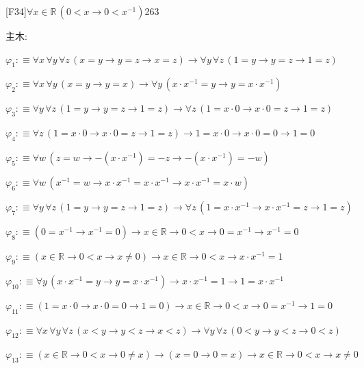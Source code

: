 \begin{fullproof}{[F34]}{$\forall x \in \mathbb{R}\,(0 < x \to 0 < x^{-1})$}{263}
\begin{ptree}
\end{ptree}
\noindent 主木:
\begin{ptree}
\noLine
{}
\noLine
{}
\end{ptree}
\begin{abbrevlist}
\item $\varphi_{1} :\equiv \forall x\,\forall y\,\forall z\,(x = y \to y = z \to x = z) \to \forall y\,\forall z\,(1 = y \to y = z \to 1 = z)$
\item $\varphi_{2} :\equiv \forall x\,\forall y\,(x = y \to y = x) \to \forall y\,(x \cdot x^{-1} = y \to y = x \cdot x^{-1})$
\item $\varphi_{3} :\equiv \forall y\,\forall z\,(1 = y \to y = z \to 1 = z) \to \forall z\,(1 = x \cdot 0 \to x \cdot 0 = z \to 1 = z)$
\item $\varphi_{4} :\equiv \forall z\,(1 = x \cdot 0 \to x \cdot 0 = z \to 1 = z) \to 1 = x \cdot 0 \to x \cdot 0 = 0 \to 1 = 0$
\item $\varphi_{5} :\equiv \forall w\,(z = w \to -(x \cdot x^{-1}) = -z \to -(x \cdot x^{-1}) = -w)$
\item $\varphi_{6} :\equiv \forall w\,(x^{-1} = w \to x \cdot x^{-1} = x \cdot x^{-1} \to x \cdot x^{-1} = x \cdot w)$
\item $\varphi_{7} :\equiv \forall y\,\forall z\,(1 = y \to y = z \to 1 = z) \to \forall z\,(1 = x \cdot x^{-1} \to x \cdot x^{-1} = z \to 1 = z)$
\item $\varphi_{8} :\equiv (0 = x^{-1} \to x^{-1} = 0) \to x \in \mathbb{R} \to 0 < x \to 0 = x^{-1} \to x^{-1} = 0$
\item $\varphi_{9} :\equiv (x \in \mathbb{R} \to 0 < x \to x \neq 0) \to x \in \mathbb{R} \to 0 < x \to x \cdot x^{-1} = 1$
\item $\varphi_{10} :\equiv \forall y\,(x \cdot x^{-1} = y \to y = x \cdot x^{-1}) \to x \cdot x^{-1} = 1 \to 1 = x \cdot x^{-1}$
\item $\varphi_{11} :\equiv (1 = x \cdot 0 \to x \cdot 0 = 0 \to 1 = 0) \to x \in \mathbb{R} \to 0 < x \to 0 = x^{-1} \to 1 = 0$
\item $\varphi_{12} :\equiv \forall x\,\forall y\,\forall z\,(x < y \to y < z \to x < z) \to \forall y\,\forall z\,(0 < y \to y < z \to 0 < z)$
\item $\varphi_{13} :\equiv (x \in \mathbb{R} \to 0 < x \to 0 \neq x) \to (x = 0 \to 0 = x) \to x \in \mathbb{R} \to 0 < x \to x \neq 0$

\end{abbrevlist}
\end{fullproof}
